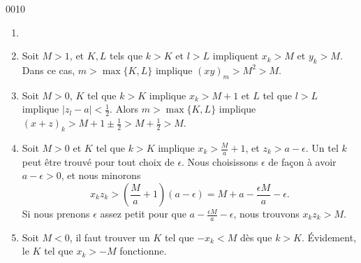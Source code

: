 
\begin{corrige}{0010}

\begin{enumerate}
\item 
\item Soit $M>1$, et $K,L$ tels que $k>K$ et $l>L$ impliquent $x_k>M$ et $y_k>M$. Dans ce cas, $m>\max\{K,L\}$ implique $(xy)_m>M^2>M$.
\item Soit $M>0$, $K$ tel que $k>K$ implique $x_k>M+1$ et $L$ tel que $l>L$ implique $| z_l-a |<\frac{ 1 }{2}$. Alors $m>\max\{ K,L \}$ implique $(x+z)_k>M+1\pm\frac{ 1 }{2}>M+\frac{ 1 }{2}>M$.
\item Soit $M>0$ et $K$ tel que $k>K$ implique $x_k>\frac{ M }{ a }+1$, et $z_k>a-\epsilon$. Un tel $k$ peut être trouvé pour tout choix de $\epsilon$. Nous choisissons $\epsilon$ de façon à avoir $a-\epsilon>0$, et nous minorons
\begin{equation}
	x_kz_k>\left( \frac{ M }{ a }+1 \right)(a-\epsilon)=M+a-\frac{ \epsilon M }{ a }-\epsilon.
\end{equation}
Si nous prenons $\epsilon$ assez petit pour que $a-\frac{ \epsilon M }{ a }-\epsilon$, nous trouvons $x_kz_k>M$.

\item Soit $M<0$, il faut trouver un $K$ tel que $-x_k<M$ dès que $k>K$. Évidement, le $K$ tel que $x_k>-M$ fonctionne.

\end{enumerate}

\end{corrige}
